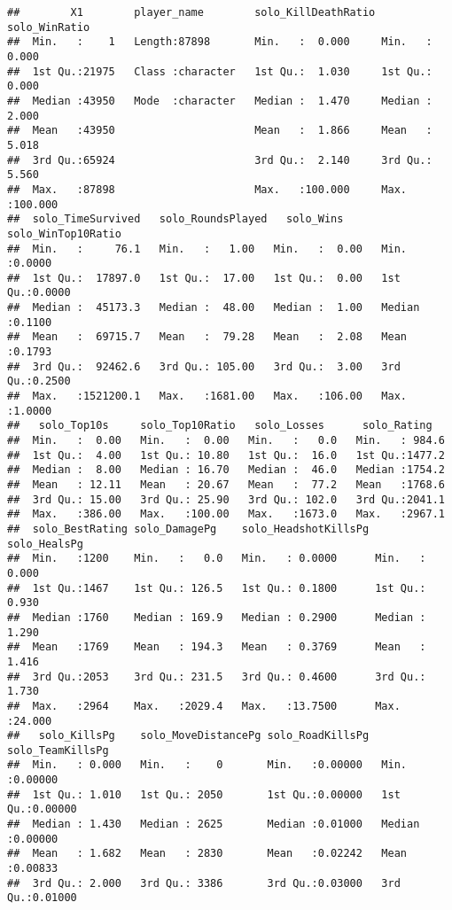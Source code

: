 \documentclass[]{article}
\begin{document}
\begin{verbatim}
##        X1        player_name        solo_KillDeathRatio solo_WinRatio    
##  Min.   :    1   Length:87898       Min.   :  0.000     Min.   :  0.000  
##  1st Qu.:21975   Class :character   1st Qu.:  1.030     1st Qu.:  0.000  
##  Median :43950   Mode  :character   Median :  1.470     Median :  2.000  
##  Mean   :43950                      Mean   :  1.866     Mean   :  5.018  
##  3rd Qu.:65924                      3rd Qu.:  2.140     3rd Qu.:  5.560  
##  Max.   :87898                      Max.   :100.000     Max.   :100.000  
##  solo_TimeSurvived   solo_RoundsPlayed   solo_Wins      solo_WinTop10Ratio
##  Min.   :     76.1   Min.   :   1.00   Min.   :  0.00   Min.   :0.0000    
##  1st Qu.:  17897.0   1st Qu.:  17.00   1st Qu.:  0.00   1st Qu.:0.0000    
##  Median :  45173.3   Median :  48.00   Median :  1.00   Median :0.1100    
##  Mean   :  69715.7   Mean   :  79.28   Mean   :  2.08   Mean   :0.1793    
##  3rd Qu.:  92462.6   3rd Qu.: 105.00   3rd Qu.:  3.00   3rd Qu.:0.2500    
##  Max.   :1521200.1   Max.   :1681.00   Max.   :106.00   Max.   :1.0000    
##   solo_Top10s     solo_Top10Ratio   solo_Losses      solo_Rating    
##  Min.   :  0.00   Min.   :  0.00   Min.   :   0.0   Min.   : 984.6  
##  1st Qu.:  4.00   1st Qu.: 10.80   1st Qu.:  16.0   1st Qu.:1477.2  
##  Median :  8.00   Median : 16.70   Median :  46.0   Median :1754.2  
##  Mean   : 12.11   Mean   : 20.67   Mean   :  77.2   Mean   :1768.6  
##  3rd Qu.: 15.00   3rd Qu.: 25.90   3rd Qu.: 102.0   3rd Qu.:2041.1  
##  Max.   :386.00   Max.   :100.00   Max.   :1673.0   Max.   :2967.1  
##  solo_BestRating solo_DamagePg    solo_HeadshotKillsPg  solo_HealsPg   
##  Min.   :1200    Min.   :   0.0   Min.   : 0.0000      Min.   : 0.000  
##  1st Qu.:1467    1st Qu.: 126.5   1st Qu.: 0.1800      1st Qu.: 0.930  
##  Median :1760    Median : 169.9   Median : 0.2900      Median : 1.290  
##  Mean   :1769    Mean   : 194.3   Mean   : 0.3769      Mean   : 1.416  
##  3rd Qu.:2053    3rd Qu.: 231.5   3rd Qu.: 0.4600      3rd Qu.: 1.730  
##  Max.   :2964    Max.   :2029.4   Max.   :13.7500      Max.   :24.000  
##   solo_KillsPg    solo_MoveDistancePg solo_RoadKillsPg  solo_TeamKillsPg 
##  Min.   : 0.000   Min.   :    0       Min.   :0.00000   Min.   :0.00000  
##  1st Qu.: 1.010   1st Qu.: 2050       1st Qu.:0.00000   1st Qu.:0.00000  
##  Median : 1.430   Median : 2625       Median :0.01000   Median :0.00000  
##  Mean   : 1.682   Mean   : 2830       Mean   :0.02242   Mean   :0.00833  
##  3rd Qu.: 2.000   3rd Qu.: 3386       3rd Qu.:0.03000   3rd Qu.:0.01000  

\end{verbatim}
\end{document}
